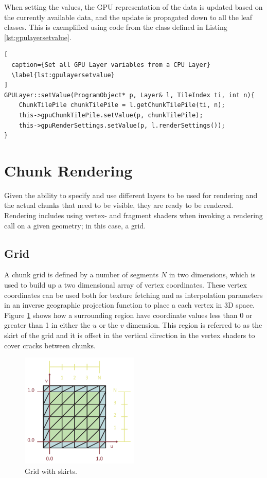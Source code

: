 When setting the values, the GPU representation of the data is updated based on the currently available  data, and the update is propagated down to all the leaf classes. This is exemplified using code from the  class defined in Listing \ref{lst:gpulayersetvalue}.

\begin{lstlisting}[
  caption={Set all GPU Layer variables from a CPU Layer} 
  \label{lst:gpulayersetvalue}
]
GPULayer::setValue(ProgramObject* p, Layer& l, TileIndex ti, int n){
	ChunkTilePile chunkTilePile = l.getChunkTilePile(ti, n);
	this->gpuChunkTilePile.setValue(p, chunkTilePile);
	this->gpuRenderSettings.setValue(p, l.renderSettings());
}
\end{lstlisting}

\section{Chunk Rendering}

Given the ability to specify and use different layers to be used for rendering and the actual chunks that need to be visible, they are ready to be rendered. Rendering includes using vertex- and fragment shaders when invoking a rendering call on a given geometry; in this case, a grid.

\subsection{Grid}

A chunk grid is defined by a number of segments $N$ in two dimensions, which is used to build up a two dimensional array of vertex coordinates. These vertex coordinates can be used both for texture fetching and as interpolation parameters in an inverse geographic projection function to place a each vertex in 3D space. Figure \ref{fig:grid} shows how a surrounding region have coordinate values less than 0 or greater than 1 in either the $u$ or the $v$ dimension. This region is referred to as the skirt of the grid and it is offset in the vertical direction in the vertex shaders to cover cracks between chunks.

\begin{figure}[htbp]
    \centering
    \includegraphics[width=0.5\textwidth]{figures/implementation/rendering/grid.pdf}
    \caption{Grid with skirts.}
    \label{fig:grid}
\end{figure}

